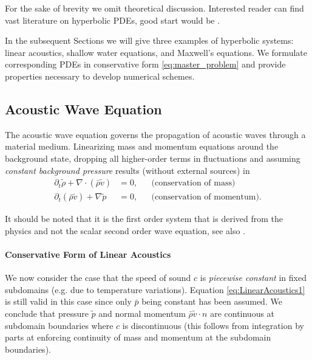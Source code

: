 \documentclass[a4paper,12pt]{article}
\theoremstyle{definition}
\theoremstyle{definition}
\begin{document}
For the sake of brevity we omit theoretical discussion.
Interested reader can find vast literature on hyperbolic PDEs, good start would be \cite[Chapter 11]{Evans}.

In the subsequent Sections we will give three examples of hyperbolic systems: linear acoustics, shallow water equations, and Maxwell's equations. We formulate corresponding PDEs in conservative form \eqref{eq:master_problem} and provide properties necessary to develop numerical schemes.

\subsection{Acoustic Wave Equation}\label{sec:SoundWaves}



The acoustic wave equation governs the propagation of acoustic waves through a material medium. Linearizing mass and momentum equations around the background state, dropping all higher-order terms in fluctuations and assuming \textit{constant background pressure} results (without external sources) in
\begin{subequations}\label{eq:LinearAcoustics1}
	\begin{align}
	\partial_t \tilde{\rho} +  \nabla\cdot(\bar{\rho} \tilde{v}) &= 0, &&\text{(conservation of mass)}\\
	\partial_t (\bar\rho \tilde{v}) + \nabla \tilde{p} &= 0, &&\text{(conservation of momentum)}.
	\end{align}
\end{subequations}

It should be noted that it is the first order system that is derived from the physics and not
the scalar second order wave equation, see also \cite[§ 2.7]{LeVeque}.

\paragraph{Conservative Form of Linear Acoustics}

We now consider the case that the speed of sound $c$ is \textit{piecewise constant} in
fixed subdomains (e.g. due to temperature variations).
Equation \eqref{eq:LinearAcoustics1} is still valid in this case since only
$\bar{p}$ being constant has been assumed.
We conclude that pressure $\tilde{p}$ and normal momentum
$\bar{\rho} \tilde{v}\cdot n$ are continuous
at subdomain boundaries where $c$ is discontinuous (this follows from integration by parts
at enforcing continuity of mass and momentum at the subdomain boundaries).
\end{document}
